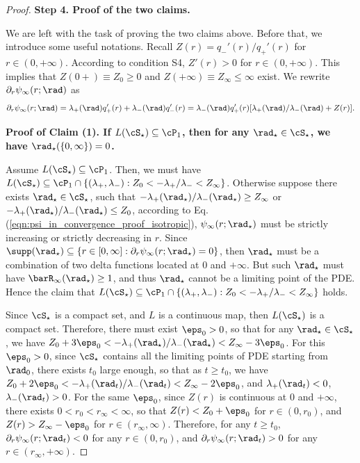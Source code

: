 \documentclass[11pt]{article}
\begin{document}
\begin{proof}
\vskip 0.2cm
\noindent
{\bf Step 4. Proof of the two claims. }

We are left with the task of proving the two claims above. Before that, we introduce some useful notations. Recall $Z(r) = q_-'(r) / q_+'(r)$ for $r \in (0, +\infty)$. According to condition {\sf S4}, $Z'(r) > 0$ for $r \in (0, +\infty)$. This implies that $Z(0 +) \equiv Z_0 \ge 0$ and $Z(+\infty) \equiv Z_\infty \le \infty$ exist. We rewrite $\partial_r \psi_\infty(r; \rad)$ as
\begin{align}\label{eqn:psi_in_convergence_proof_isotropic}
\partial_r \psi_\infty(r; \rad) = \lambda_+(\rad) q_+'(r) + \lambda_-(\rad) q_-'(r) =\lambda_-(\rad)q_+'(r) [ \lambda_+(\rad) / \lambda_-(\rad) + Z(r) ]. 
\end{align}


\vskip 0.2cm
\noindent
{\bf Proof of Claim (1). If $L(\cS_\star) \subseteq \cP_1$, then for any $\rad_\star \in \cS_\star$, we have $\rad_\star(\{0, \infty \}) = 0$. } 


Assume $L(\cS_\star) \subseteq \cP_1$. Then, we must have $L(\cS_\star) \subseteq \cP_1 \cap \{(\lambda_+, \lambda_-) : Z_0 < - \lambda_+ / \lambda_- < Z_\infty\}$. Otherwise suppose there exists $\rad_\star \in \cS_\star$, such that $- \lambda_+(\rad_\star) / \lambda_-(\rad_\star) \ge Z_\infty$ or $- \lambda_+(\rad_\star) / \lambda_-(\rad_\star) \le Z_0$, according to Eq. (\ref{eqn:psi_in_convergence_proof_isotropic}), $\psi_\infty(r; \rad_\star)$ must be strictly increasing or strictly decreasing in $r$. Since $\supp(\rad_\star) \subseteq \{ r \in [0, \infty]:  \partial_r \psi_\infty(r; \rad_\star) = 0\}$, then $\rad_\star$ must be a combination of two delta functions located at $0$ and $+\infty$. But such $\rad_\star$ must have $\barR_\infty(\rad_\star) \ge 1$, and thus $\rad_\star$ cannot be a limiting point of the PDE. Hence the claim that $L(\cS_\star) \subseteq \cP_1 \cap \{(\lambda_+, \lambda_-) : Z_0 < - \lambda_+ / \lambda_- < Z_\infty\}$ holds. 

Since $\cS_\star$ is a compact set, and $L$ is a continuous map, then $L(\cS_\star)$ is a compact set. Therefore, there must exist $\eps_0 > 0$, so that for any $\rad_\star \in \cS_\star$, we have $Z_0 + 3\eps_0 < -\lambda_+(\rad_\star) / \lambda_-(\rad_\star) < Z_\infty - 3\eps_0$. For this $\eps_0 > 0$, since $\cS_\star$ contains all the limiting points of PDE starting from $\rad_0$, there exists $t_0$ large enough, so that as $t \ge t_0$, we have $Z_0 + 2\eps_0 < - \lambda_+(\rad_t) / \lambda_-(\rad_t) < Z_\infty - 2\eps_0$, and $\lambda_+(\rad_t) < 0$, $\lambda_-(\rad_t) > 0$. For the same $\eps_0$, since $Z(r)$ is continuous at $0$ and $+\infty$, there exists $0 < r_0 < r_\infty < \infty$, so that $Z(r) < Z_0 + \eps_0$ for $r \in (0, r_0)$, and $Z(r) > Z_\infty - \eps_0$ for $r \in (r_\infty, \infty)$. Therefore, for any $t \ge t_0$, $\partial_r \psi_\infty(r; \rad_t) < 0$ for any $r \in (0, r_0)$, and $\partial_r \psi_\infty(r; \rad_t) > 0$ for any $r \in (r_\infty, +\infty)$. 


\end{proof}
\end{document}
